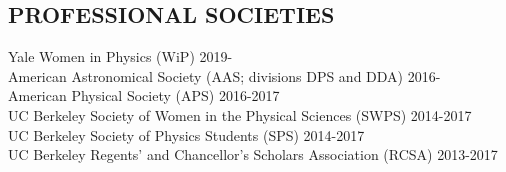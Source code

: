 \documentclass[margin]{res}
\begin{document}
\begin{resume}
\section{\normalfont PROFESSIONAL SOCIETIES}
Yale Women in Physics (WiP) \hfill 2019- \\
American Astronomical Society (AAS; divisions DPS and DDA) \hfill 2016- \\
American Physical Society (APS) \hfill 2016-2017 \\
UC Berkeley Society of Women in the Physical Sciences (SWPS) \hfill 2014-2017 \\
UC Berkeley Society of Physics Students (SPS) \hfill 2014-2017 \\
UC Berkeley Regents' and Chancellor's Scholars Association (RCSA) \hfill2013-2017 \\
\vspace{-10mm}



\end{resume}
\(\)
\end{document}
